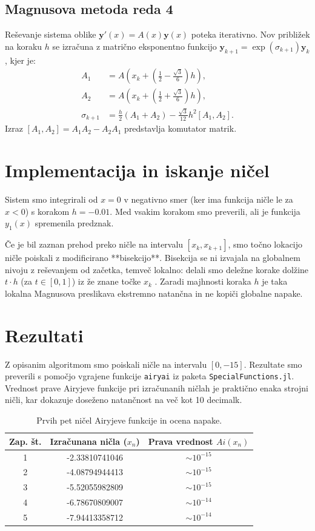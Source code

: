 \documentclass[11pt, a4paper]{article}
\begin{document}
\subsection{Magnusova metoda reda 4}
Reševanje sistema oblike $\mathbf{y}'(x) = A(x)\mathbf{y}(x)$ poteka iterativno. Nov približek na koraku $h$ se izračuna z matrično eksponentno funkcijo $\mathbf{y}_{k+1} = \exp(\sigma_{k+1})\mathbf{y}_k$, kjer je:
\begin{align}
    A_1 &= A\left(x_k + \left(\frac{1}{2} - \frac{\sqrt{3}}{6}\right)h\right), \\
    A_2 &= A\left(x_k + \left(\frac{1}{2} + \frac{\sqrt{3}}{6}\right)h\right), \\
    \sigma_{k+1} &= \frac{h}{2}(A_1 + A_2) - \frac{\sqrt{3}}{12}h^2 [A_1, A_2].
\end{align}
Izraz $[A_1, A_2] = A_1 A_2 - A_2 A_1$ predstavlja komutator matrik.

\section{Implementacija in iskanje ničel}
Sistem smo integrirali od $x = 0$ v negativno smer (ker ima funkcija ničle le za $x < 0$) s korakom $h = -0.01$. Med vsakim korakom smo preverili, ali je funkcija $y_1(x)$ spremenila predznak.

Če je bil zaznan prehod preko ničle na intervalu $[x_k, x_{k+1}]$, smo točno lokacijo ničle poiskali z modificirano **bisekcijo**. Bisekcija se ni izvajala na globalnem nivoju z reševanjem od začetka, temveč lokalno: delali smo deležne korake dolžine $t \cdot h$ (za $t \in [0, 1]$) iz že znane točke $x_k$ \cite{plestenjak2015}. Zaradi majhnosti koraka $h$ je taka lokalna Magnusova preslikava ekstremno natančna in ne kopiči globalne napake.

\section{Rezultati}
Z opisanim algoritmom smo poiskali ničle na intervalu $[0, -15]$. Rezultate smo preverili s pomočjo vgrajene funkcije \texttt{airyai} iz paketa \texttt{SpecialFunctions.jl}. Vrednost prave Airyjeve funkcije pri izračunanih ničlah je praktično enaka strojni ničli, kar dokazuje doseženo natančnost na več kot 10 decimalk.

\begin{table}[H]
    \centering
    \begin{tabular}{ccc}
        \toprule
        Zap. št. & Izračunana ničla ($x_n$) & Prava vrednost $Ai(x_n)$ \\
        \midrule
        1 & -2.33810741046 & $\sim 10^{-15}$ \\
        2 & -4.08794944413 & $\sim 10^{-15}$ \\
        3 & -5.52055982809 & $\sim 10^{-15}$ \\
        4 & -6.78670809007 & $\sim 10^{-14}$ \\
        5 & -7.94413358712 & $\sim 10^{-14}$ \\
        \bottomrule
    \end{tabular}
    \caption{Prvih pet ničel Airyjeve funkcije in ocena napake.}
\end{table}
\end{document}
